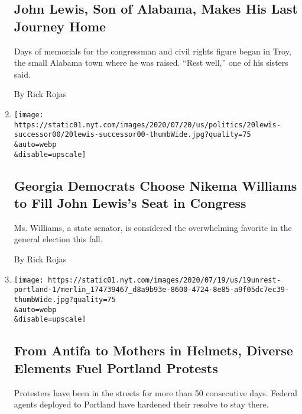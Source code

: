\begin{enumerate}
  \hypertarget{john-lewis-son-of-alabama-makes-his-last-journey-home}{%
  \subsection{John Lewis, Son of Alabama, Makes His Last Journey
  Home}\label{john-lewis-son-of-alabama-makes-his-last-journey-home}}

  Days of memorials for the congressman and civil rights figure began in
  Troy, the small Alabama town where he was raised. ``Rest well,'' one
  of his sisters said.

  By Rick Rojas
\item
  \href{/2020/07/20/us/politics/john-lewis-successor-congress.html}{}

  \texttt{[image: https://static01.nyt.com/images/2020/07/20/us/politics/20lewis-successor00/20lewis-successor00-thumbWide.jpg?quality=75\\\&auto=webp\\\&disable=upscale]}

  \hypertarget{georgia-democrats-choose-nikema-williams-to-fill-john-lewiss-seat-in-congress}{%
  \subsection{Georgia Democrats Choose Nikema Williams to Fill John
  Lewis's Seat in
  Congress}\label{georgia-democrats-choose-nikema-williams-to-fill-john-lewiss-seat-in-congress}}

  Ms. Williams, a state senator, is considered the overwhelming favorite
  in the general election this fall.

  By Rick Rojas
\item
  \href{/2020/07/19/us/portland-protests.html}{}

  \texttt{[image: https://static01.nyt.com/images/2020/07/19/us/19unrest-portland-1/merlin\_174739467\_d8a9b93e-8600-4724-8e85-a9f05dc7ec39-thumbWide.jpg?quality=75\\\&auto=webp\\\&disable=upscale]}

  \hypertarget{from-antifa-to-mothers-in-helmets-diverse-elements-fuel-portland-protests}{%
  \subsection{From Antifa to Mothers in Helmets, Diverse Elements Fuel
  Portland
  Protests}\label{from-antifa-to-mothers-in-helmets-diverse-elements-fuel-portland-protests}}

  Protesters have been in the streets for more than 50 consecutive days.
  Federal agents deployed to Portland have hardened their resolve to
  stay there.


\end{enumerate}
